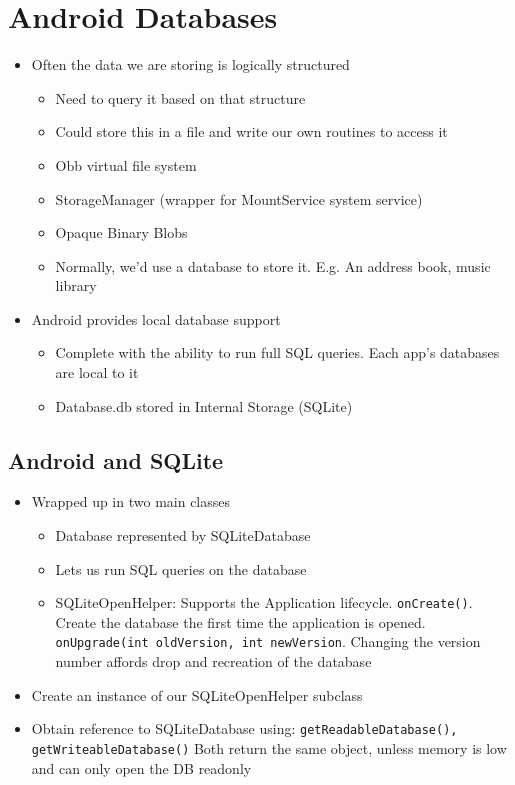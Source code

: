 \documentclass{article}
\begin{document}
\section{Android Databases}

\begin{itemize}
  \item Often the data we are storing is logically structured
  \begin{itemize}
    \item Need to query it based on that structure 
    \item Could store this in a file and write our own routines to access it 
    \item Obb virtual file system 
    \item StorageManager (wrapper for MountService system service) 
    \item Opaque Binary Blobs 
    \item Normally, we'd use a database to store it. E.g. An address book, music library
  \end{itemize}
  \item Android provides local database support
  \begin{itemize}
    \item Complete with the ability to run full SQL queries. Each app’s databases are local to it 
    \item Database.db stored in Internal Storage (SQLite)
  \end{itemize}
\end{itemize}

\subsection{Android and SQLite}

\begin{itemize}
  \item Wrapped up in two main classes
  \begin{itemize}
    \item Database represented by SQLiteDatabase 
    \item Lets us run SQL queries on the database 
    \item SQLiteOpenHelper: Supports the Application lifecycle. \verb|onCreate()|. Create the database the first time the application is opened. \verb|onUpgrade(int oldVersion, int newVersion|. Changing the version number affords drop and recreation of the database
  \end{itemize}
  \item Create an instance of our SQLiteOpenHelper subclass 
  \item Obtain reference to SQLiteDatabase using: \verb|getReadableDatabase(), getWriteableDatabase()| Both return the same object, unless memory is low and can only open the DB readonly
\end{itemize}
\end{document}
